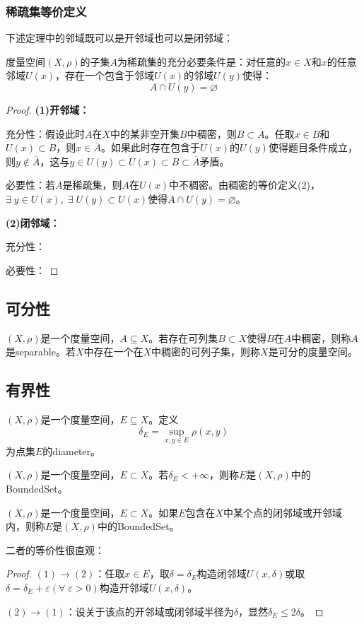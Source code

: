 \subsubsection{稀疏集等价定义}
下述定理中的邻域既可以是开邻域也可以是闭邻域：
\begin{theorem}
	度量空间$(X,\rho)$的子集$A$为稀疏集的充分必要条件是：对任意的$x\in X$和$x$的任意邻域$U(x)$，存在一个包含于邻域$U(x)$的邻域$U(y)$使得：
	\begin{equation*}
		A\cap U(y)=\varnothing
	\end{equation*}
\end{theorem}
\begin{proof}
	\textbf{(1)开邻域：}\par
	充分性：假设此时$A$在$X$中的某非空开集$B$中稠密，则$B\subset\overline{A}$。任取$x\in B$和$U(x)\subset B$，则$x\in\overline{A}$。如果此时存在包含于$U(x)$的$U(y)$使得题目条件成立，则$y\notin\overline{A}$，这与$y\in U(y)\subset U(x)\subset B\subset\overline{A}$矛盾。\par
	必要性：若$A$是稀疏集，则$A$在$U(x)$中不稠密。由稠密的等价定义(2)，$\exists\;y\in U(x),\;\exists\;U(y)\subset U(x)$使得$A\cap U(y)=\varnothing$。\par
	\textbf{(2)闭邻域：}\par
	充分性：\par
	必要性：
\end{proof}
\subsection{可分性}
\begin{definition}
	$(X,\rho)$是一个度量空间，$A\subseteq X$。若存在可列集$B\subset X$使得$B$在$A$中稠密，则称$A$是\gls{separable}。若$X$中存在一个在$X$中稠密的可列子集，则称$X$是可分的度量空间。
\end{definition}
\subsection{有界性}
\begin{definition}
	$(X,\rho)$是一个度量空间，$E\subseteq X$。定义
	\begin{equation*}
		\delta_E=\sup_{x,y\in E}\rho(x,y)
	\end{equation*}
	为点集$E$的\gls{diameter}。
\end{definition}
\begin{definition}\label{def:BoundedSet1}
	$(X,\rho)$是一个度量空间，$E\subset X$。若$\delta_E<+\infty$，则称$E$是$(X,\rho)$中的\gls{BoundedSet}。
\end{definition}
\begin{definition}\label{def:BoundedSet2}
	$(X,\rho)$是一个度量空间，$E\subset X$。如果$E$包含在$X$中某个点的闭邻域或开邻域内，则称$E$是$(X,\rho)$中的\gls{BoundedSet}。
\end{definition}
二者的等价性很直观：
\begin{proof}
	$(1)\to(2)$：任取$x\in E$，取$\delta=\delta_E$构造闭邻域$U(x,\delta)$或取$\delta=\delta_E+\varepsilon(\forall\;\varepsilon>0)$构造开邻域$U(x,\delta)$。\par
	$(2)\to(1)$：设关于该点的开邻域或闭邻域半径为$\delta$，显然$\delta_E\leqslant 2\delta$。
\end{proof}